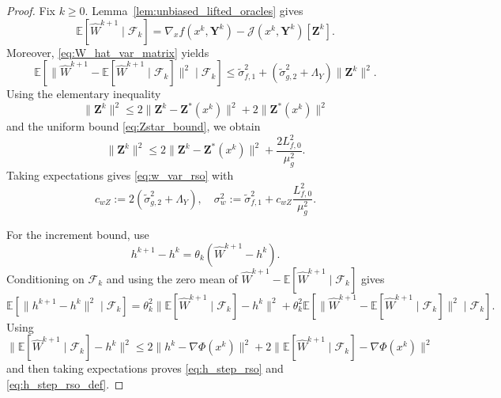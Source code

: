 \documentclass{pkumelon}
\theoremstyle{plain}
\newcommand{\E}{\mathbb{E}}
\newcommand{\Phiobj}{\Phi}
\begin{document}
\begin{proof}
Fix $k\ge 0$. Lemma~\ref{lem:unbiased_lifted_oracles} gives
\begin{equation*}
\E[\widehat W^{k+1}\mid \mathcal F_k] = \nabla_x f(x^k,\boldsymbol Y^k)-\mathcal J(x^k,\boldsymbol Y^k)[\boldsymbol Z^k].
\end{equation*}
Moreover, \eqref{eq:W_hat_var_matrix} yields
\begin{equation*}
\E[\|\widehat W^{k+1}-\E[\widehat W^{k+1}\mid\mathcal F_k]\|^2\mid \mathcal F_k] \le \tilde\sigma_{f,1}^2+(\tilde\sigma_{g,2}^2+\Lambda_Y)\|\boldsymbol Z^k\|^2.
\end{equation*}
Using the elementary inequality
\begin{equation*}
\|\boldsymbol Z^k\|^2 \le 2\|\boldsymbol Z^k-\boldsymbol Z^*(x^k)\|^2+2\|\boldsymbol Z^*(x^k)\|^2
\end{equation*}
and the uniform bound \eqref{eq:Zstar_bound}, we obtain
\begin{equation*}
\|\boldsymbol Z^k\|^2 \le 2\|\boldsymbol Z^k-\boldsymbol Z^*(x^k)\|^2+\frac{2L_{f,0}^2}{\mu_g^2}.
\end{equation*}
Taking expectations gives \eqref{eq:w_var_rso} with
\begin{equation*}
c_{wZ}:=2(\tilde\sigma_{g,2}^2+\Lambda_Y), \quad \sigma_w^2:=\tilde\sigma_{f,1}^2+c_{wZ}\frac{L_{f,0}^2}{\mu_g^2}.
\end{equation*}

For the increment bound, use
\begin{equation*}
h^{k+1}-h^k=\theta_k(\widehat W^{k+1}-h^k).
\end{equation*}
Conditioning on $\mathcal F_k$ and using the zero mean of $\widehat W^{k+1}-\E[\widehat W^{k+1}\mid \mathcal F_k]$ gives
\begin{equation*}
\E[\|h^{k+1}-h^k\|^2\mid \mathcal F_k]
=\theta_k^2\|\E[\widehat W^{k+1}\mid \mathcal F_k]-h^k\|^2+\theta_k^2\E[\|\widehat W^{k+1}-\E[\widehat W^{k+1}\mid \mathcal F_k]\|^2\mid \mathcal F_k].
\end{equation*}
Using
\begin{equation*}
\|\E[\widehat W^{k+1}\mid \mathcal F_k]-h^k\|^2 \le 2\|h^k-\nabla\Phiobj(x^k)\|^2 +2\|\E[\widehat W^{k+1}\mid \mathcal F_k]-\nabla\Phiobj(x^k)\|^2
\end{equation*}
and then taking expectations proves \eqref{eq:h_step_rso} and \eqref{eq:h_step_rso_def}.
\end{proof}
\end{document}
